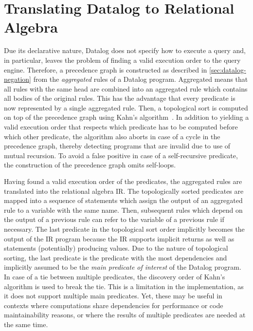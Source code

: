 \section{Translating Datalog to Relational Algebra}\label{sec:datalog-to-relational-algebra}

Due its declarative nature, Datalog does not specify how to execute a query
and, in particular, leaves the problem of finding a valid execution order
to the query engine.
Therefore, a precedence graph is constructed as described in \ref{sec:datalog-negation}
from the \emph{aggregated} rules of a Datalog program.
Aggregated means that all rules with the same head are combined into an
aggregated rule which contains all bodies of the original rules.
This has the advantage that every predicate is now represented by a single
aggregated rule.
Then, a topological sort is computed on top of the precedence graph using
Kahn's algorithm~\cite{kahn1962topological}.
In addition to yielding a valid execution order that respects which predicate has
to be computed before which other predicate, the algorithm also aborts in
case of a cycle in the precedence graph, thereby detecting programs that are
invalid due to use of mutual recursion.
To avoid a false positive in case of a self-recursive predicate,
the construction of the precedence graph omits self-loops.

Having found a valid execution order of the predicates,
the aggregated rules are translated into the relational algebra \ac{IR}.
The topologically sorted predicates are mapped into a sequence of statements
which assign the output of an aggregated rule to a variable with the same name.
Then, subsequent rules which depend on the output of a previous rule can refer
to the variable of a previous rule if necessary.
The last predicate in the topological sort order implicitly becomes the output
of the \ac{IR} program because the \ac{IR} supports implicit returns as well as
statements (potentially) producing values.
Due to the nature of topological sorting, the last predicate is the
predicate with the most dependencies and implicitly assumed to be the
\emph{main predicate of interest} of the Datalog program.
In case of a tie between multiple predicates, the discovery order of Kahn's
algorithm is used to break the tie.
This is a limitation in the implementation, as it does not support multiple
main predicates.
Yet, these may be useful in contexts where computations share dependencies
for performance or code maintainability reasons, or where the results of multiple
predicates are needed at the same time.

